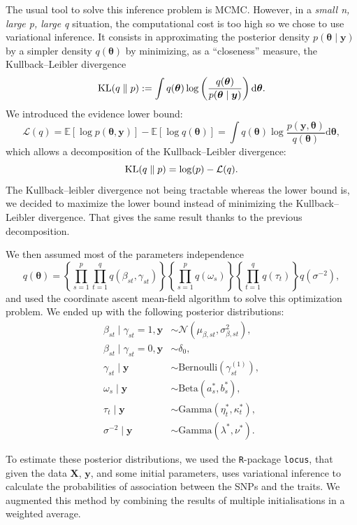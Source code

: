 \documentclass[a4paper, 11pt]{report}
\numberwithin{equation}{chapter}
\DeclareMathOperator*{\KL}{{\rm KL}}
\begin{document}
The usual tool to solve this inference problem is MCMC. However, in a \textit{small n, large p, large q} situation, the computational cost is too high so we chose to use variational inference. It consists in approximating the posterior density $p(\boldsymbol{\theta}\mid\boldsymbol{y})$ by a simpler density $q(\boldsymbol{\theta})$ by minimizing, as a ``closeness'' measure, the Kullback--Leibler divergence
$$
\KL(q\parallel p) := \int q(\boldsymbol{\theta})\log \left(\frac{q(\boldsymbol{\theta})}{p(\boldsymbol{\theta} \mid \boldsymbol{y})}\right) \mathrm{d}\boldsymbol{\theta}.
$$
We introduced the evidence lower bound:
$$
\mathcal{L}(q) = \mathbb{E}\left[\log p(\boldsymbol{\theta},\boldsymbol{y})\right] - \mathbb{E}\left[\log q(\boldsymbol{\theta})\right] =\int q(\boldsymbol{\theta})\log\frac{p(\boldsymbol{y},\boldsymbol{\theta})}{q(\boldsymbol{\theta})}\mathrm{d}\boldsymbol{\theta},
$$
which allows a decomposition of the Kullback--Leibler divergence:
$$
\KL(q\parallel p) = \log(p) - \mathcal{L}(q).
$$
The Kullback--leibler divergence not being tractable whereas the lower bound is, we decided to maximize the lower bound instead of minimizing the Kullback--Leibler divergence. That gives the same result thanks to the previous decomposition.

We then assumed most of the parameters independence
$$
q(\boldsymbol{\theta}) =\left\lbrace\prod_{s=1}^p \prod_{t=1}^q q(\beta_{st}, \gamma_{st})\right\rbrace \left\lbrace\prod_{s=1}^p  q(\omega_s)\right\rbrace \left\lbrace\prod_{t=1}^q q(\tau_t)\right\rbrace q(\sigma^{-2}),
$$
and used the coordinate ascent mean-field algorithm to solve this optimization problem. We ended up with the following posterior distributions:
\begin{align*}
\beta_{st} \mid \gamma_{st} = 1, \boldsymbol{y} &\sim \mathcal{N}\left(\mu_{\beta, st},\sigma^2_{\beta, st}\right),\\
\beta_{st} \mid \gamma_{st} = 0, \boldsymbol{y} &\sim \delta_0,\\
\gamma_{st} \mid \boldsymbol{y} &\sim \text{Bernoulli}(\gamma_{st}^{(1)}),\\
\omega_s\mid\boldsymbol{y} &\sim \text{Beta}(a_s^*,b_s^*),\\
\tau_t\mid \boldsymbol{y} &\sim \text{Gamma}(\eta^*_t, \kappa^*_t),\\
\sigma^{-2} \mid \boldsymbol{y} &\sim \text{Gamma}(\lambda^*, \nu^*).
\end{align*}

To estimate these posterior distributions, we used the \texttt{R}-package \texttt{locus}, that given the data $\boldsymbol{X}$, $\boldsymbol{y}$, and some initial parameters, uses variational inference to calculate the probabilities of association between the SNPs and the traits. We augmented this method by combining the results of multiple initialisations in a weighted average.
\end{document}
